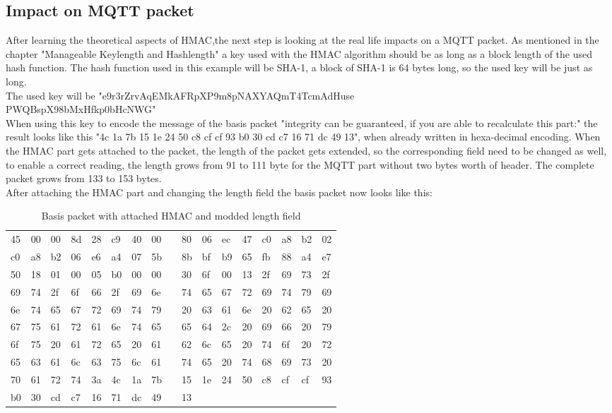 \subsection{Impact on MQTT packet}
After learning the theoretical aspects of HMAC,the next step is looking at the real life impacts on a MQTT packet.
As mentioned in the chapter "Manageable Keylength and Hashlength" a key used with the HMAC algorithm should be as long as a block length of the used hash function. The hash function used in this example will be SHA-1, a block of SHA-1 is 64 bytes long, so the used key will be just as long. \\ The used key will be "e9r3rZrvAqEMkAFRpXP9m8pNAXYAQmT4TcmAdHuse\\PWQBspX98bMxHfkp0bHcNWG" \\
When using this key to encode the message of the basis packet "integrity can be guaranteed, if you are able to recalculate this part:" the result looks like this "4c 1a 7b 15 1e 24 50 c8 cf cf 93 b0 30 cd c7 16 71 dc 49 13", when already written in hexa-decimal encoding. When the HMAC part gets attached to the packet, the length of the packet gets extended, so the corresponding field need to be changed as well, to enable a correct reading, the length grows from 91 to 111 byte for the MQTT part without two bytes worth of header. The complete packet grows from 133 to 153 bytes.\\
After attaching the HMAC part and changing the length field the basis packet now looks like this:
\begin{table}[]
\centering
\begin{tabular}{lllllllllllllllll}
45 & 00 & 00 & 8d & 28 & c9 & 40 & 00 &  & 80 & 06 & ec & 47 & c0 & a8 & b2 & 02 \\
c0 & a8 & b2 & 06 & e6 & a4 & 07 & 5b &  & 8b & bf & b9 & 65 & fb & 88 & a4 & e7 \\
50 & 18 & 01 & 00 & 05 & b0 & 00 & 00 &  & 30 & 6f & 00 & 13 & 2f & 69 & 73 & 2f \\
69 & 74 & 2f & 6f & 66 & 2f & 69 & 6e &  & 74 & 65 & 67 & 72 & 69 & 74 & 79 & 69 \\
6e & 74 & 65 & 67 & 72 & 69 & 74 & 79 &  & 20 & 63 & 61 & 6e & 20 & 62 & 65 & 20 \\
67 & 75 & 61 & 72 & 61 & 6e & 74 & 65 &  & 65 & 64 & 2c & 20 & 69 & 66 & 20 & 79 \\
6f & 75 & 20 & 61 & 72 & 65 & 20 & 61 &  & 62 & 6c & 65 & 20 & 74 & 6f & 20 & 72 \\
65 & 63 & 61 & 6c & 63 & 75 & 6c & 61 &  & 74 & 65 & 20 & 74 & 68 & 69 & 73 & 20 \\
70 & 61 & 72 & 74 & 3a & 4c & 1a & 7b &  & 15 & 1e & 24 & 50 & c8 & cf & cf & 93 \\
b0 & 30 & cd & c7 & 16 & 71 & dc & 49 &  & 13 &    &    &    &    &    &    &    \\  
\end{tabular}
\caption{Basis packet with attached HMAC and modded length field}
\label{tab:MQTT-HMAC}
\end{table}


